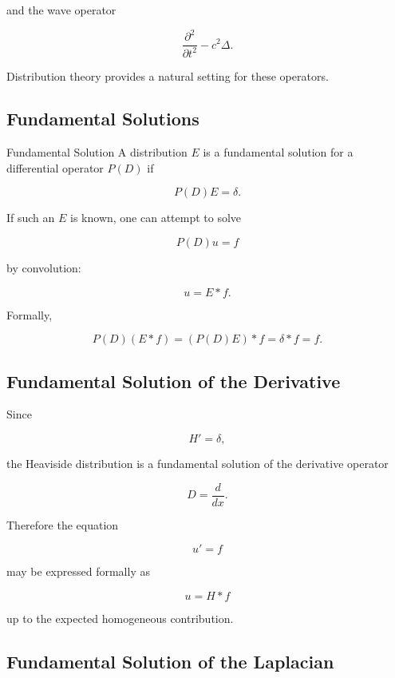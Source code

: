 and the wave operator

\[
\boxed{
\frac{\partial^2}{\partial t^2}
-
c^2\Delta.
}
\]

Distribution theory provides a natural setting for these operators.

\subsection{Fundamental Solutions}
\label{subsec:fundamental-solutions}

\begin{definitionbox}{Fundamental Solution}
A distribution \(E\) is a fundamental solution for a differential
operator \(P(D)\) if

\[
\boxed{
P(D)E=\delta.
}
\]
\end{definitionbox}

If such an \(E\) is known, one can attempt to solve

\[
P(D)u=f
\]

by convolution:

\[
\boxed{
u=E*f.
}
\]

Formally,

\[
P(D)(E*f)
=
(P(D)E)*f
=
\delta*f
=
f.
\]

\subsection{Fundamental Solution of the Derivative}
\label{subsec:fundamental-solution-derivative}

Since

\[
\boxed{
H'=\delta,
}
\]

the Heaviside distribution is a fundamental solution of the derivative
operator

\[
D=\frac{d}{dx}.
\]

Therefore the equation

\[
u'=f
\]

may be expressed formally as

\[
\boxed{
u=H*f
}
\]

up to the expected homogeneous contribution.

\subsection{Fundamental Solution of the Laplacian}
\label{subsec:fundamental-solution-laplacian}

